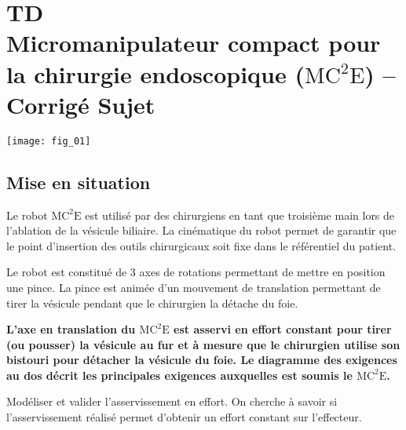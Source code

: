 \chapter*{TD  \\ 
Micromanipulateur compact pour la chirurgie endoscopique ($\text{MC}^2\text{E}$) -- 
\ifprof Corrigé \else Sujet \fi}

\iflivret {} \else
\ifprof  {} \else \fi
\fi

\setcounter{question}{0}

\begin{marginfigure} [4cm]
\centering
\texttt{[image: fig\_01]}
\end{marginfigure}

\section*{Mise en situation}
\ifprof
\else
Le robot $\text{MC}^2\text{E}$ est utilisé par des chirurgiens en tant que troisième main lors de l'ablation de la vésicule biliaire. La cinématique du robot permet de garantir que le point d'insertion des outils chirurgicaux soit fixe dans le référentiel du patient. 

Le robot est constitué de 3 axes de rotations permettant de mettre en position une pince. La pince est animée d'un mouvement de translation permettant de tirer la vésicule pendant que le chirurgien la détache du foie. 

\textbf{L’axe en translation du $\text{MC}^2\text{E}$ est asservi en effort constant pour tirer (ou pousser) la vésicule au fur et à mesure que le chirurgien utilise son bistouri pour détacher la vésicule du foie. Le diagramme des exigences au dos décrit les principales exigences auxquelles est soumis le $\text{MC}^2\text{E}$.}


\begin{obj}
Modéliser et valider l’asservissement en effort. On cherche à savoir si l'asservissement réalisé permet d'obtenir un effort constant sur l'effecteur. 
\end{obj}

